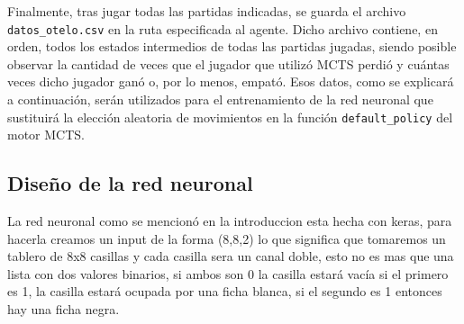 \documentclass[conference]{IEEEtran}
\begin{document}
Finalmente, tras jugar todas las partidas indicadas, se guarda el archivo \texttt{datos\_otelo.csv} en la ruta especificada al agente. Dicho archivo contiene, en orden, todos los estados intermedios de todas las partidas jugadas, siendo posible observar la cantidad de veces que el jugador que utilizó MCTS perdió y cuántas veces dicho jugador ganó o, por lo menos, empató. Esos datos, como se explicará a continuación, serán utilizados para el entrenamiento de la red neuronal que sustituirá la elección aleatoria de movimientos en la función \texttt{default\_policy} del motor MCTS.

\subsection{Diseño de la red neuronal}
La red neuronal como se mencionó en la introduccion esta hecha con keras, para hacerla 
creamos un input de la forma (8,8,2) lo que significa que tomaremos un tablero de 8x8 casillas y cada casilla
sera un canal doble, esto no es mas que una lista con dos valores binarios, si ambos son 0 la casilla estará vacía
si el primero es 1, la casilla estará ocupada por una ficha blanca, si el segundo es 1 entonces hay una ficha negra.
\end{document}
